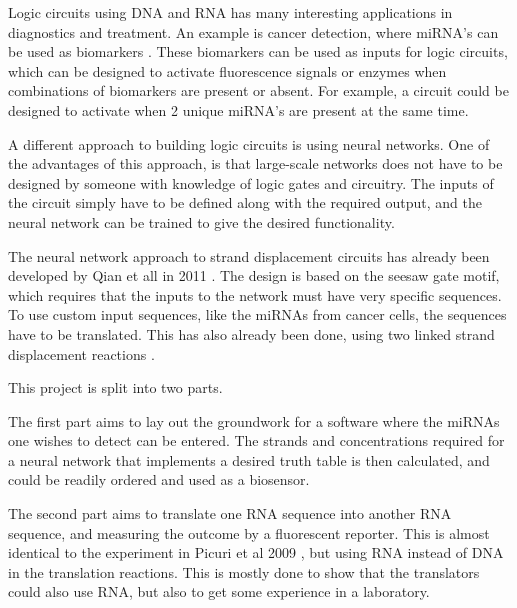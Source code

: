 Logic circuits using DNA and RNA has many interesting applications in diagnostics and treatment. An example is cancer detection, where miRNA's can be used as biomarkers \cite{Peng2016}. These biomarkers can be used as inputs for logic circuits, which can be designed to activate fluorescence signals \cite{Seelig2006} or enzymes \cite{Engelen2016} when combinations of biomarkers are present or absent. For example, a circuit could be designed to activate when 2 unique miRNA's are present at the same time.

A different approach to building logic circuits is using neural networks. One of the advantages of this approach, is that large-scale networks does not have to be designed by someone with knowledge of logic gates and circuitry. The inputs of the circuit simply have to be defined along with the required output, and the neural network can be trained to give the desired functionality.

The neural network approach to strand displacement circuits has already been developed by Qian et all in 2011 \cite{Qian2011}. The design is based on the seesaw gate motif, which requires that the inputs to the network must have very specific sequences. To use custom input sequences, like the miRNAs from cancer cells, the sequences have to be translated. This has also already been done, using two linked strand displacement reactions \cite{Picuri2009}.

This project is split into two parts.

The first part aims to lay out the groundwork for a software where the miRNAs one wishes to detect can be entered. The strands and concentrations required for a neural network that implements a desired truth table is then calculated, and could be readily ordered and used as a biosensor.

The second part aims to translate one RNA sequence into another RNA sequence, and measuring the outcome by a fluorescent reporter. This is almost identical to the experiment in Picuri et al 2009 \cite{Picuri2009}, but using RNA instead of DNA in the translation reactions. This is mostly done to show that the translators could also use RNA, but also to get some experience in a laboratory.
